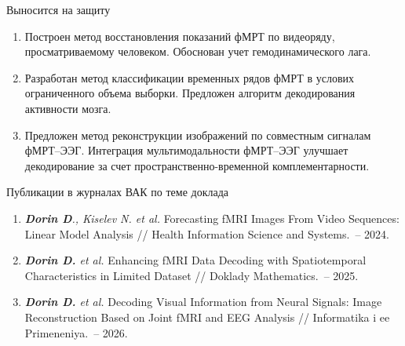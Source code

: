 \documentclass[aspectratio=43]{beamer}
\begin{document}
\begin{frame}{Выносится на защиту}
\footnotesize
\begin{enumerate}
\justifying
    \item Построен метод восстановления показаний фМРТ по видеоряду, просматриваемому человеком. Обоснован учет гемодинамического лага.
    \item Разработан метод классификации временных рядов фМРТ в услових ограниченного объема выборки. Предложен алгоритм декодирования активности мозга.
    \item Предложен метод реконструкции изображений по совместным сигналам фМРТ--ЭЭГ. Интеграция мультимодальности фМРТ--ЭЭГ улучшает декодирование за счет пространственно-временной комплементарности.
\end{enumerate}
\footnotesize
\begin{block}{\small Публикации в журналах ВАК по теме доклада}
\begin{enumerate}
\justifying
    \item \textit{\textbf{Dorin D}., Kiselev N. et al.} Forecasting fMRI Images From Video Sequences: Linear Model Analysis // Health Information Science and Systems.~-- 2024.
    \item \textit{\textbf{Dorin D.} et al.} Enhancing fMRI Data Decoding with Spatiotemporal Characteristics in Limited Dataset // Doklady Mathematics.~-- 2025.
    \item \textit{\textbf{Dorin D.} et al.} Decoding Visual Information from Neural Signals: Image Reconstruction Based on Joint fMRI and EEG Analysis // Informatika i ee Primeneniya.~-- 2026.
\end{enumerate}
\end{block}
\end{frame}
\end{document}
